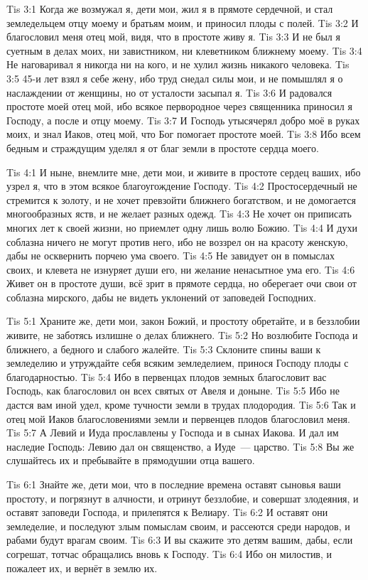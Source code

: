 \vs Tis 3:1
Когда же возмужал я, дети мои, жил я в прямоте сердечной,
и стал земледельцем отцу моему и братьям моим,
и приносил плоды с полей.
\vs Tis 3:2
И благословил меня отец мой, видя, что в простоте живу я.
\vs Tis 3:3
И не был я суетным в делах моих, ни завистником, ни клеветником
ближнему моему.
\vs Tis 3:4
Не наговаривал я никогда ни на кого, и не хулил жизнь никакого человека.
\vs Tis 3:5
45-и лет взял я себе жену, ибо труд снедал силы мои,
и не помышлял я о наслаждении от женщины, но от усталости засыпал я.
\vs Tis 3:6
И радовался простоте моей отец мой, ибо всякое первородное через
священника приносил я Господу, а после и отцу моему.
\vs Tis 3:7
И Господь утысячерял добро моё в руках моих,
и знал Иаков, отец мой, что Бог помогает простоте моей.
\vs Tis 3:8
Ибо всем бедным и страждущим уделял я от благ земли в простоте сердца моего.

\vs Tis 4:1
И ныне, внемлите мне, дети мои, и живите в простоте сердец
ваших, ибо узрел я, что в этом всякое благоугождение Господу.
\vs Tis 4:2
Простосердечный не стремится к золоту, и не хочет превзойти ближнего
богатством, и не домогается многообразных яств, и не желает разных одежд.
\vs Tis 4:3
Не хочет он приписать многих лет к своей жизни, но приемлет одну лишь
волю Божию.
\vs Tis 4:4
И духи соблазна ничего не могут против него,
ибо не воззрел он на красоту женскую, дабы не осквернить порчею ума своего.
\vs Tis 4:5
Не завидует он в помыслах своих, и клевета не изнуряет души его,
ни желание ненасытное ума его.
\vs Tis 4:6
Живет он в простоте души, всё зрит в прямоте сердца,
но оберегает очи свои от соблазна мирского,
дабы не видеть уклонений от заповедей Господних.

\vs Tis 5:1
Храните же, дети мои, закон Божий, и простоту обретайте, и в
беззлобии живите, не заботясь излишне о делах ближнего.
\vs Tis 5:2
Но возлюбите Господа и ближнего, а бедного и слабого жалейте.
\vs Tis 5:3
Склоните спины ваши к земледелию и утруждайте себя всяким земледелием,
принося Господу плоды с благодарностью.
\vs Tis 5:4
Ибо в первенцах плодов земных благословит вас Господь,
как благословил он всех святых от Авеля и доныне.
\vs Tis 5:5
Ибо не дастся вам иной удел, кроме тучности земли в трудах плодородия.
\vs Tis 5:6
Так и отец мой Иаков благословениями земли
и первенцев плодов благословил меня.
\vs Tis 5:7
А Левий и Иуда прославлены у Господа и в сынах Иакова.
И дал им наследие Господь:
Левию дал он священство, а Иуде~--- царство.
\vs Tis 5:8
Вы же слушайтесь их и пребывайте в прямодушии отца вашего.

\vs Tis 6:1
Знайте же, дети мои, что в последние времена
оставят сыновья ваши простоту, и погрязнут в алчности,
и отринут беззлобие, и совершат злодеяния,
и оставят заповеди Господа,
и прилепятся к Велиару.
\vs Tis 6:2
И оставят они земледелие, и последуют злым помыслам своим,
и рассеются среди народов, и рабами будут врагам своим.
\vs Tis 6:3
И вы скажите это детям вашим, дабы, если согрешат, тотчас обращались
вновь к Господу.
\vs Tis 6:4
Ибо он милостив, и пожалеет их, и вернёт в землю их.

